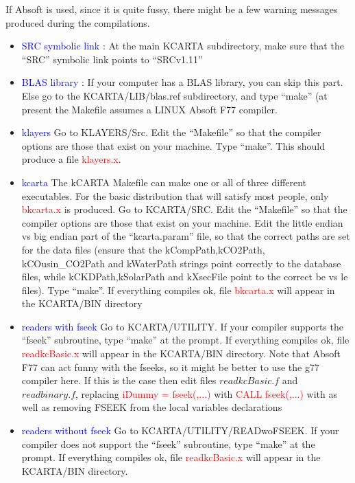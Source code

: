 \documentclass[12pt]{article}
\newcommand{\kc}{\textsf{kCARTA}\xspace}
\begin{document}
If Absoft is used, since it is quite fussy, there might be a few warning 
messages produced during the compilations.

\begin{itemize}
\item \textcolor{blue} {SRC symbolic link} :  At the main KCARTA 
subdirectory, make sure that the ``SRC'' symbolic link points to ``SRCv1.11''
\item \textcolor{blue} {BLAS library} : If your computer has a BLAS library, 
you can skip this part. Else go to the KCARTA/LIB/blas.ref subdirectory, and 
type ``make'' (at present the Makefile assumes a LINUX Absoft F77 compiler.
\item \textcolor{blue} {klayers} Go to KLAYERS/Src. Edit the 
``Makefile'' so that the compiler options are those that exist on your 
machine. Type ``make''. This should produce a file \textcolor{red}{klayers.x}.
\item \textcolor{blue} {kcarta} The \kc Makefile can make one or all of 
three different executables. For the basic distribution that will satisfy 
most people, only \textcolor{red} {bkcarta.x} is produced.
Go to KCARTA/SRC. Edit the ``Makefile'' so that the 
compiler options are those that exist on your machine. Edit the little endian 
vs big endian part of the ``kcarta.param'' file, so that the correct paths
are set for the data files (ensure that the kCompPath,kCO2Path,
kCOusin\_CO2Path and kWaterPath 
strings point correctly to the database files, while kCKDPath,kSolarPath and 
kXsecFile point to the correct be vs le files). Type ``make''. If everything 
compiles ok, file \textcolor{red}{bkcarta.x} will appear in the 
KCARTA/BIN directory
\item \textcolor{blue} {readers with fseek} Go to 
KCARTA/UTILITY. If your compiler supports the  ``fseek'' subroutine, type 
``make'' at the prompt. If everything compiles ok, 
file \textcolor{red}{readkcBasic.x} will appear in the KCARTA/BIN directory.
Note that Absoft F77 can act funny with the fseeks, so it might be better to 
use the g77 compiler here. If this is the case then edit files 
$readkcBasic.f$ and $readbinary.f$, replacing 
\textcolor{red}{iDummy = fseek(,...)} with
\textcolor{red}{CALL fseek(,...)} with
as well as removing FSEEK from the local variables declarations
\item \textcolor{blue} {readers without fseek} Go to 
KCARTA/UTILITY/READwoFSEEK. If your compiler does not support the 
``fseek'' subroutine, type ``make'' at the prompt. If everything compiles ok, 
file \textcolor{red}{readkcBasic.x} will appear in the KCARTA/BIN directory.
\end{itemize}
\end{document}
